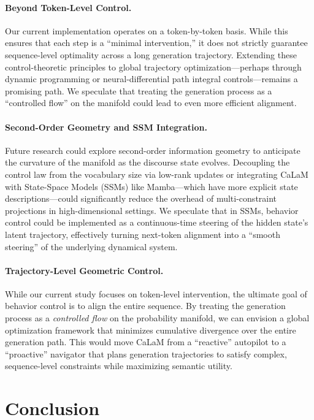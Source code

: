 \documentclass{article}
\theoremstyle{plain}
\theoremstyle{definition}
\theoremstyle{remark}
\begin{document}
\paragraph{Beyond Token-Level Control.}
Our current implementation operates on a token-by-token basis. While this ensures that each step is a ``minimal intervention,'' it does not strictly guarantee sequence-level optimality across a long generation trajectory. Extending these control-theoretic principles to global trajectory optimization—perhaps through dynamic programming or neural-differential path integral controls—remains a promising path. We speculate that treating the generation process as a ``controlled flow'' on the manifold could lead to even more efficient alignment.

\paragraph{Second-Order Geometry and SSM Integration.}
Future research could explore second-order information geometry to anticipate the curvature of the manifold as the discourse state evolves. Decoupling the control law from the vocabulary size via low-rank updates or integrating CaLaM with State-Space Models (SSMs) like Mamba—which have more explicit state descriptions—could significantly reduce the overhead of multi-constraint projections in high-dimensional settings. We speculate that in SSMs, behavior control could be implemented as a continuous-time steering of the hidden state's latent trajectory, effectively turning next-token alignment into a ``smooth steering'' of the underlying dynamical system.

\paragraph{Trajectory-Level Geometric Control.}
While our current study focuses on token-level intervention, the ultimate goal of behavior control is to align the entire sequence. By treating the generation process as a \textit{controlled flow} on the probability manifold, we can envision a global optimization framework that minimizes cumulative divergence over the entire generation path. This would move CaLaM from a ``reactive'' autopilot to a ``proactive'' navigator that plans generation trajectories to satisfy complex, sequence-level constraints while maximizing semantic utility.


\section{Conclusion}
\label{sec:conclusion}
\end{document}
